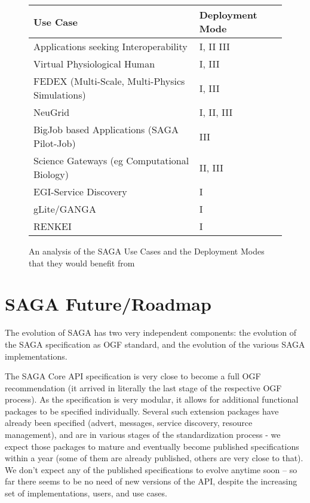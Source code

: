 \documentclass[10pt,conference,final,letterpaper,twoside,twocolumn,]{IEEEtran}
\begin{document}
\begin{figure}[t]
\centering
\begin{tabular}{ll}
Use Case & Deployment Mode \\
\hline
Applications seeking Interoperability & I, II III \\
Virtual Physiological Human & I, III\\
FEDEX (Multi-Scale, Multi-Physics Simulations)  & I, III\\
NeuGrid  & I, II, III\\
BigJob based Applications (SAGA Pilot-Job)  &  III\\
Science Gateways (eg Computational Biology)  & II, III \\
EGI-Service Discovery  & I\\
gLite/GANGA  & I \\
RENKEI  & I\\
\hline
\end{tabular}
\caption{An analysis of the SAGA Use Cases and the Deployment Modes
  that they would benefit from}
\end{figure}

\section{SAGA Future/Roadmap}

 The evolution of SAGA has two very independent components: the
 evolution of the SAGA specification as OGF standard, and the
 evolution of the various SAGA implementations.

 The SAGA Core API specification is very close to become a full OGF
 recommendation (it arrived in literally the last stage of the
 respective OGF process).  As the specification is very modular, it
 allows for additional functional packages to be specified
 individually.  Several such extension packages have already been
 specified (advert, messages, service discovery, resource management),
 and are in various stages of the standardization process - we expect
 those packages to mature and eventually become published
 specifications within a year (some of them are already published,
 others are very close to that).  We don't expect any of the published
 specifications to evolve anytime soon -- so far there seems to be no
 need of new versions of the API, despite the increasing set of
 implementations, users, and use cases.
\end{document}
